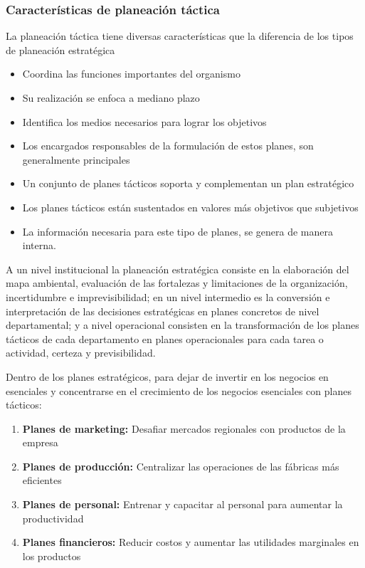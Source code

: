 \subsubsection{Características de planeación táctica}
La planeación táctica tiene diversas características que la diferencia de los tipos de planeación estratégica
\begin{itemize}
    \item Coordina las funciones importantes del organismo
    \item Su realización se enfoca a mediano plazo
    \item Identifica los medios necesarios para lograr los objetivos
    \item Los encargados responsables de la formulación de estos planes, son generalmente principales
    \item Un conjunto de planes tácticos soporta y complementan un plan estratégico
    \item Los planes tácticos están sustentados en valores más objetivos que subjetivos
    \item La información necesaria para este tipo de planes, se genera de manera interna.
\end{itemize}
A un nivel institucional la planeación estratégica consiste en la elaboración del mapa ambiental, evaluación de las fortalezas y limitaciones de la organización, incertidumbre e imprevisibilidad; en un nivel intermedio es la conversión e interpretación de las decisiones estratégicas en planes concretos de nivel departamental; y a nivel operacional consisten en la transformación de los planes tácticos de cada departamento en planes operacionales para cada tarea o actividad, certeza y previsibilidad.

Dentro de los planes estratégicos, para dejar de invertir en los negocios en esenciales y concentrarse en el crecimiento de los negocios esenciales con planes tácticos:
\begin{enumerate}
    \item \textbf{Planes de marketing:} Desafiar mercados regionales con productos de la empresa
    \item \textbf{Planes de producción:} Centralizar las operaciones de las fábricas más eficientes
    \item \textbf{Planes de personal:} Entrenar y capacitar al personal para aumentar la productividad
    \item \textbf{Planes financieros:} Reducir costos y aumentar las utilidades marginales en los productos
\end{enumerate}
